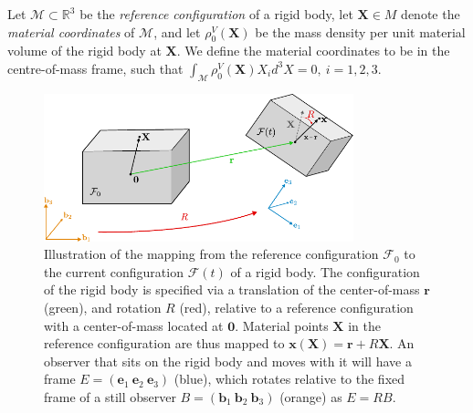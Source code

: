 Let $\mathscr{M} \subset \mathbb{R}^3$ be the \textit{reference configuration} of a rigid body, let $\mathbf{X} \in M$ denote the \textit{material coordinates} of $\mathscr{M}$, and let $\rho^V_0(\mathbf{X})$ be the mass density per unit material volume of the rigid body at $\mathbf{X}$. We define the material coordinates to be in the centre-of-mass frame, such that $\int_\mathscr{M} \rho^V_0(\mathbf{X}) X_i d^3 X = 0,\ i=1,2,3$.

\begin{figure}[t]
\centering
        \includegraphics[width=0.8\textwidth]{figs_part2/sec3.1_introduction/rigid_body_kinematics.pdf}
        \caption{Illustration of the mapping from the reference configuration $\mathcal{F}_0$ to the current configuration $\mathcal{F}(t)$ of a rigid body. The configuration of the rigid body is specified via a translation of the center-of-mass $\mathbf{r}$ (green), and rotation $R$ (red), relative to a reference configuration with a center-of-mass located at $\mathbf{0}$. Material points $\mathbf{X}$ in the reference configuration are thus mapped to $\mathbf{x}(\mathbf{X}) = \mathbf{r} + R \mathbf{X}$. An observer that sits on the rigid body and moves with it will have a frame $E = (\mathbf{e}_1\ \mathbf{e}_2\ \mathbf{e}_3)$ (blue), which rotates relative to the fixed frame of a still observer $B = (\mathbf{b}_1\ \mathbf{b}_2\ \mathbf{b}_3)$ (orange) as $E = RB$.}
        \label{fig:rigid body kinematics}
\end{figure}

